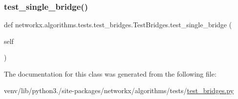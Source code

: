 \mbox{\label{classnetworkx_1_1algorithms_1_1tests_1_1test__bridges_1_1TestBridges_a360861e27147b81bab64b943b5390ab6}} 
\subsubsection{\texorpdfstring{test\+\_\+single\+\_\+bridge()}{test\_single\_bridge()}}
{\footnotesize\ttfamily def networkx.\+algorithms.\+tests.\+test\+\_\+bridges.\+Test\+Bridges.\+test\+\_\+single\+\_\+bridge (\begin{DoxyParamCaption}\item[{}]{self }\end{DoxyParamCaption})}



The documentation for this class was generated from the following file\+:\begin{DoxyCompactItemize}
\item 
venv/lib/python3./site-\/packages/networkx/algorithms/tests/\hyperlink{test__bridges_8py}{test\+\_\+bridges.\+py}\end{DoxyCompactItemize}
